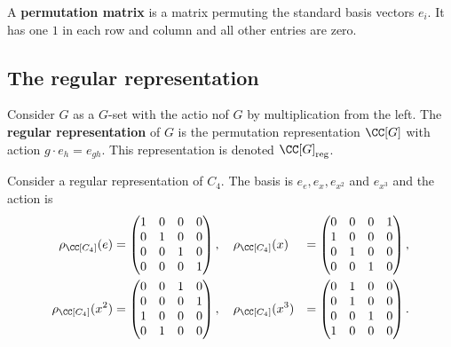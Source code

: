 \documentclass[12pt, a4paper]{article}
\begin{document}
\begin{definition}
    A \textbf{permutation matrix} is a matrix permuting the standard basis vectors \(e_i\). It has one \(1\) in each row and column and all other entries are zero.
\end{definition}

\subsection{The regular representation}

\begin{definition}
    Consider \(G\) as a \(G\)-set with the actio nof \(G\) by multiplication from the left. The \textbf{regular representation} of \(G\) is the permutation representation \(\CC[G]\) with action \(g\cdot e_h = e_{gh}\). This representation is denoted \(\CC[G]_{\text{reg}}\).
\end{definition}

\begin{example}
    Consider a regular representation of \(C_4\). The basis is \(e_e,e_x,e_{x^2}\) and \(e_{x^3}\) and the action is 
    \[\begin{aligned}
        \rho_{\CC[C_4]}(e) &= \begin{pmatrix} 1 & 0 & 0 & 0 \\ 0 & 1 & 0 & 0 \\ 0& 0 & 1 & 0 \\ 0 & 0 & 0 & 1 \end{pmatrix}, 
        \quad \rho_{\CC[C_4]}(x) &= \begin{pmatrix} 0 & 0 & 0 & 1 \\ 1 & 0 & 0 & 0 \\ 0& 1 & 0 & 0 \\ 0 & 0 & 1 & 0 \end{pmatrix}, \\
        \rho_{\CC[C_4]}(x^2) &= \begin{pmatrix} 0 & 0 & 1 & 0 \\ 0 & 0 & 0 & 1 \\ 1& 0 & 0 & 0 \\ 0 & 1& 0 & 0 \end{pmatrix}, \quad 
        \rho_{\CC[C_4]}(x^3) &= \begin{pmatrix} 0 & 1 & 0 & 0 \\ 0 & 1 & 0 & 0 \\ 0& 0 & 1 & 0 \\ 1 & 0 & 0 & 0 \end{pmatrix}.
    \end{aligned}\]
\end{example}
\end{document}
